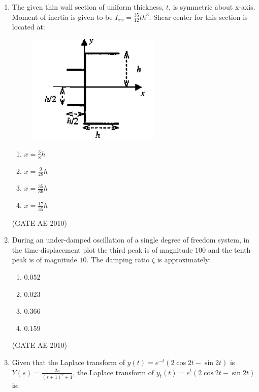 \documentclass[journal]{IEEEtran}
\begin{document}
\begin{enumerate}
\item The given thin wall section of uniform thickness, $t$, is symmetric about x-axis. Moment of inertia is given to be $I_{xx} = \frac{35}{12} t h^3$. Shear center for this section is located at:

\begin{figure}[H]
\centering
\includegraphics[width=0.6\textwidth]{6.png}
\caption{}
\label{fig:question31}
\end{figure}

\begin{multicols}{4}
\begin{enumerate}
\item $x = \frac{3}{8} h$  
\item $x = \frac{9}{28} h$  
\item $x = \frac{35}{36} h$  
\item $x = \frac{17}{35} h$  
\end{enumerate}
\end{multicols}
\hfill (GATE AE 2010)

\item During an under-damped oscillation of a single degree of freedom system, in the time-displacement plot the third peak is of magnitude $100$ and the tenth peak is of magnitude $10$. The damping ratio $\zeta$ is approximately:

\begin{multicols}{4}
\begin{enumerate}
\item $0.052$  
\item $0.023$  
\item $0.366$  
\item $0.159$  
\end{enumerate}
\end{multicols}
\hfill (GATE AE 2010)

\item Given that the Laplace transform of $y(t) = e^{-t} (2 \cos 2t - \sin 2t)$ is $Y(s) = \frac{2s}{(s + 1)^2 + 4}$, the Laplace transform of $y_t(t) = e^t (2 \cos 2t - \sin 2t)$ is:


\end{enumerate}
\end{document}

